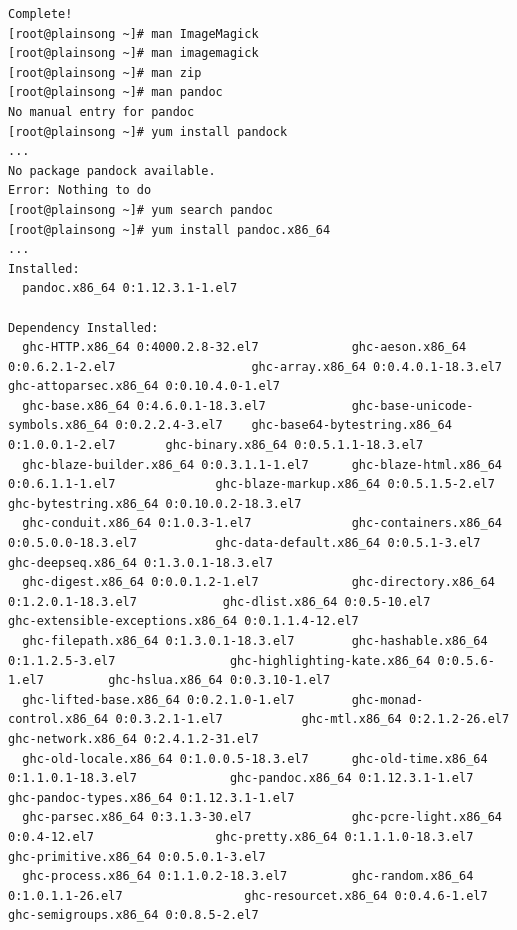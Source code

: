 \documentclass[10pt]{article}
\begin{document}
\begin{Verbatim}[fontsize=\scriptsize]
Complete!
[root@plainsong ~]# man ImageMagick
[root@plainsong ~]# man imagemagick
[root@plainsong ~]# man zip
[root@plainsong ~]# man pandoc
No manual entry for pandoc
[root@plainsong ~]# yum install pandock
...
No package pandock available.
Error: Nothing to do
[root@plainsong ~]# yum search pandoc
[root@plainsong ~]# yum install pandoc.x86_64
...
Installed:
  pandoc.x86_64 0:1.12.3.1-1.el7                                                                                                                                                                            

Dependency Installed:
  ghc-HTTP.x86_64 0:4000.2.8-32.el7             ghc-aeson.x86_64 0:0.6.2.1-2.el7                   ghc-array.x86_64 0:0.4.0.1-18.3.el7                ghc-attoparsec.x86_64 0:0.10.4.0-1.el7              
  ghc-base.x86_64 0:4.6.0.1-18.3.el7            ghc-base-unicode-symbols.x86_64 0:0.2.2.4-3.el7    ghc-base64-bytestring.x86_64 0:1.0.0.1-2.el7       ghc-binary.x86_64 0:0.5.1.1-18.3.el7                
  ghc-blaze-builder.x86_64 0:0.3.1.1-1.el7      ghc-blaze-html.x86_64 0:0.6.1.1-1.el7              ghc-blaze-markup.x86_64 0:0.5.1.5-2.el7            ghc-bytestring.x86_64 0:0.10.0.2-18.3.el7           
  ghc-conduit.x86_64 0:1.0.3-1.el7              ghc-containers.x86_64 0:0.5.0.0-18.3.el7           ghc-data-default.x86_64 0:0.5.1-3.el7              ghc-deepseq.x86_64 0:1.3.0.1-18.3.el7               
  ghc-digest.x86_64 0:0.0.1.2-1.el7             ghc-directory.x86_64 0:1.2.0.1-18.3.el7            ghc-dlist.x86_64 0:0.5-10.el7                      ghc-extensible-exceptions.x86_64 0:0.1.1.4-12.el7   
  ghc-filepath.x86_64 0:1.3.0.1-18.3.el7        ghc-hashable.x86_64 0:1.1.2.5-3.el7                ghc-highlighting-kate.x86_64 0:0.5.6-1.el7         ghc-hslua.x86_64 0:0.3.10-1.el7                     
  ghc-lifted-base.x86_64 0:0.2.1.0-1.el7        ghc-monad-control.x86_64 0:0.3.2.1-1.el7           ghc-mtl.x86_64 0:2.1.2-26.el7                      ghc-network.x86_64 0:2.4.1.2-31.el7                 
  ghc-old-locale.x86_64 0:1.0.0.5-18.3.el7      ghc-old-time.x86_64 0:1.1.0.1-18.3.el7             ghc-pandoc.x86_64 0:1.12.3.1-1.el7                 ghc-pandoc-types.x86_64 0:1.12.3.1-1.el7            
  ghc-parsec.x86_64 0:3.1.3-30.el7              ghc-pcre-light.x86_64 0:0.4-12.el7                 ghc-pretty.x86_64 0:1.1.1.0-18.3.el7               ghc-primitive.x86_64 0:0.5.0.1-3.el7                
  ghc-process.x86_64 0:1.1.0.2-18.3.el7         ghc-random.x86_64 0:1.0.1.1-26.el7                 ghc-resourcet.x86_64 0:0.4.6-1.el7                 ghc-semigroups.x86_64 0:0.8.5-2.el7                 

\end{Verbatim}
\end{document}
